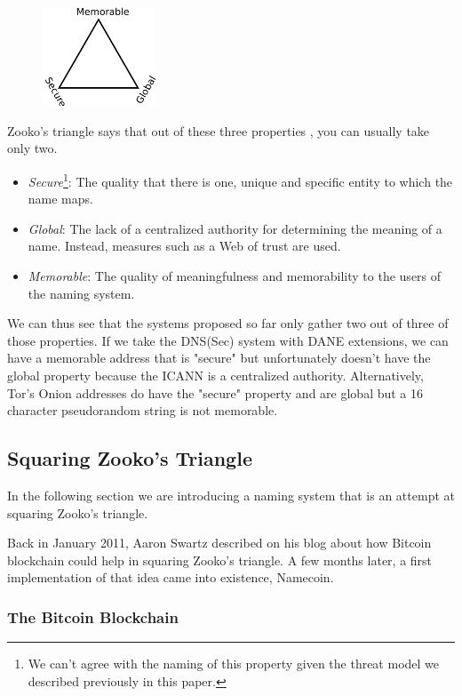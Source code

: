 \documentclass{vldb}
\begin{document}
\begin{figure}[h!]
\centering
\includegraphics[width=0.3\textwidth]{ZookoTriangle.png}
\end{figure}

Zooko's triangle says that out of these three properties \cite{zookoTriangleWikipedia}, you can usually take only two.
\begin{itemize}
\item \emph{Secure}\footnote{We can't agree with the naming of this property given the threat model we described previously in this paper.}: The quality that there is one, unique and specific entity to which the name maps.
\item \emph{Global}: The lack of a centralized authority for determining the meaning of a name. Instead, measures such as a Web of trust are used.
\item \emph{Memorable}: The quality of meaningfulness and memorability to the users of the naming system.
\end{itemize}

We can thus see that the systems proposed so far only gather two out of three of those properties. If we take the DNS(Sec) system with DANE extensions, we can have a memorable address that is "secure" but unfortunately doesn't have the global property because the ICANN is a centralized authority. Alternatively, Tor's Onion addresses do have the "secure" property and are global but a 16 character pseudorandom string is not memorable.

\subsection{Squaring Zooko's Triangle}

In the following section we are introducing a naming system that is an attempt at squaring Zooko's triangle.

Back in January 2011, Aaron Swartz described on his blog about how Bitcoin blockchain could help in squaring Zooko's triangle. A few months later, a first implementation of that idea came into existence, Namecoin.

\subsubsection{The Bitcoin Blockchain}
\end{document}
